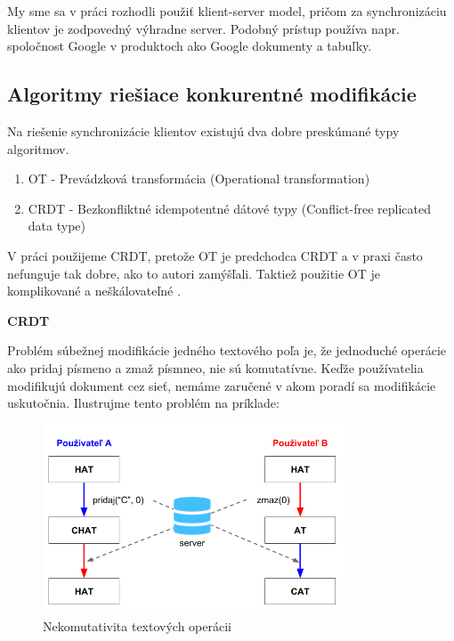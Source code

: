 My sme sa v práci rozhodli použiť klient-server model, pričom za synchronizáciu klientov
je zodpovedný výhradne server. Podobný prístup používa napr. spoločnost Google v produktoch
ako Google dokumenty a tabuľky.

\subsection{Algoritmy riešiace konkurentné modifikácie}
Na riešenie synchronizácie klientov existujú dva dobre preskúmané typy algoritmov.
\begin{enumerate}
  \item OT - Prevádzková transformácia (Operational transformation)
  \item CRDT - Bezkonfliktné idempotentné dátové typy (Conflict-free replicated data type)
\end{enumerate}
V práci použijeme CRDT, pretože OT je predchodca CRDT a v praxi často nefunguje tak dobre,
ako to autori zamýšľali. Taktiež použitie OT je komplikované a neškálovateľné \cite{ot_nonscalable}.

\begin{flushleft}\textbf {CRDT}\end{flushleft}
Problém súbežnej modifikácie jedného textového poľa je, že jednoduché operácie ako
pridaj písmeno a zmaž písmneo, nie sú komutatívne. Keďže používatelia modifikujú dokument
cez sieť, nemáme zaručené v akom poradí sa modifikácie uskutočnia. Ilustrujme tento
problém na príklade:

\begin{figure}
\centerline{\includegraphics[width=0.8\textwidth]{images/nekomutativne_operacie}}
\caption[Nekomutativita textových operácii]{Nekomutativita textových operácii}
\label{obr:cursus}
\end{figure}

